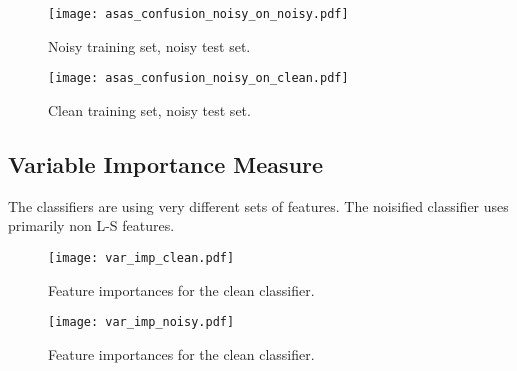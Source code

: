 \documentclass[10pt]{article}
\begin{document}
\begin{figure}[H]
\begin{center}
\texttt{[image: asas\_confusion\_noisy\_on\_noisy.pdf]}
\caption{Noisy training set, noisy test set.\label{fig:asas_confusion_noisy_on_noisy}}
\end{center}
\end{figure}

\begin{figure}[H]
\begin{center}
\texttt{[image: asas\_confusion\_noisy\_on\_clean.pdf]}
\caption{Clean training set, noisy test set.\label{fig:asas_confusion_noisy_on_clean}}
\end{center}
\end{figure}



\subsection{Variable Importance Measure}

The classifiers are using very different sets of features. The noisified classifier uses primarily non L-S features.

\begin{figure}[H]
\begin{center}
\texttt{[image: var\_imp\_clean.pdf]}
\caption{Feature importances for the clean classifier.\label{fig:var_imp_clean}}
\end{center}
\end{figure}

\begin{figure}[H]
\begin{center}
\texttt{[image: var\_imp\_noisy.pdf]}
\caption{Feature importances for the clean classifier.\label{fig:var_imp_noisy}}
\end{center}
\end{figure}
\end{document}
